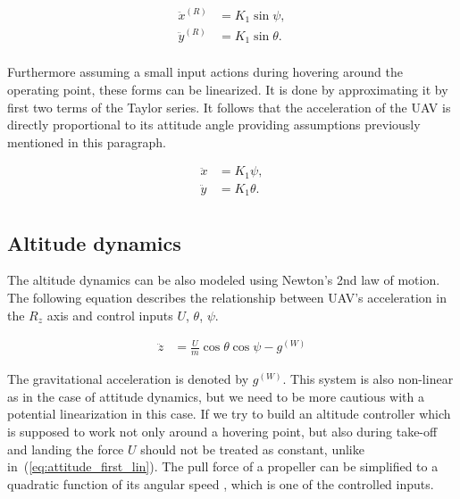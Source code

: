 \begin{equation}
\begin{split}
\ddot{x}^{(R)} &= K_1\sin \psi,\\
\ddot{y}^{(R)} &= K_1\sin \theta.\\
\end{split}
\label{eq:attitude_first_lin}
\end{equation}

Furthermore assuming a small input actions during hovering around the operating point, these forms can be linearized. It is done by approximating it by first two terms of the Taylor series. It follows that the acceleration of the UAV is directly proportional to its attitude angle providing assumptions previously mentioned in this paragraph.

\begin{equation}
\begin{split}
\ddot{x} &= K_1 \psi,\\
\ddot{y} &= K_1 \theta.\\
\end{split}
\end{equation}

\subsection{Altitude dynamics}

The altitude dynamics can be also modeled using Newton's 2nd law of motion. The following equation describes the relationship between UAV's acceleration in the $R_z$ axis and control inputs $U$, $\theta$, $\psi$.

\begin{equation}
\begin{split}
\ddot{z} &= \frac{U}{m}\cos\theta\cos\psi - g^{(W)}
\end{split}
\end{equation}

The gravitational acceleration is denoted by $g^{(W)}$. This system is also non-linear as in the case of attitude dynamics, but we need to be more cautious with a potential linearization in this case. If we try to build an altitude controller which is supposed to work not only around a hovering point, but also during take-off and landing the force $U$ should not be treated as constant, unlike in~(\ref{eq:attitude_first_lin}). The pull force of a propeller can be simplified to a quadratic function of its angular speed \citep{luukkonen2011modelling}, which is one of the controlled inputs.

